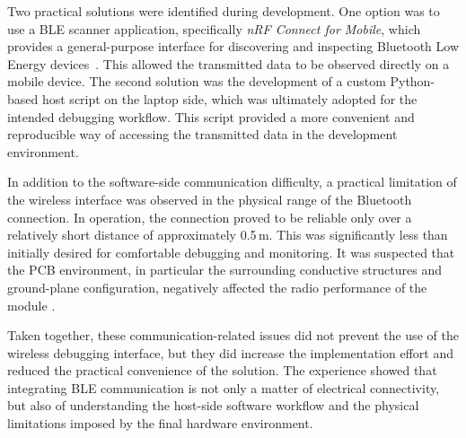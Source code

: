Two practical solutions were identified during development. One option was to use a BLE scanner application, specifically \emph{nRF Connect for Mobile}, which provides a general-purpose interface for discovering and inspecting Bluetooth Low Energy devices~\cite{nrfconnect}. This allowed the transmitted data to be observed directly on a mobile device. The second solution was the development of a custom Python-based host script on the laptop side, which was ultimately adopted for the intended debugging workflow. This script provided a more convenient and reproducible way of accessing the transmitted data in the development environment.

In addition to the software-side communication difficulty, a practical limitation of the wireless interface was observed in the physical range of the Bluetooth connection. In operation, the connection proved to be reliable only over a relatively short distance of approximately 0.5\,m. This was significantly less than initially desired for comfortable debugging and monitoring. It was suspected that the PCB environment, in particular the surrounding conductive structures and ground-plane configuration, negatively affected the radio performance of the module \cite{datasheet_bluetooth}.

Taken together, these communication-related issues did not prevent the use of the wireless debugging interface, but they did increase the implementation effort and reduced the practical convenience of the solution. The experience showed that integrating BLE communication is not only a matter of electrical connectivity, but also of understanding the host-side software workflow and the physical limitations imposed by the final hardware environment.
